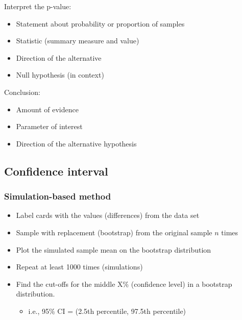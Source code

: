 \documentclass[
]{report}
\providecommand{\tightlist}{%
  \setlength{\itemsep}{0pt}\setlength{\parskip}{0pt}}
\begin{document}
Interpret the p-value:

\begin{itemize}
\item
  Statement about probability or proportion of samples
\item
  Statistic (summary measure and value)
\item
  Direction of the alternative
\item
  Null hypothesis (in context)
\end{itemize}

\vspace{0.8in}

\newpage

Conclusion:

\begin{itemize}
\item
  Amount of evidence
\item
  Parameter of interest
\item
  Direction of the alternative hypothesis
\end{itemize}

\vspace{0.8in}

\subsection*{Confidence interval}\label{confidence-interval-3}

\subsubsection*{Simulation-based method}\label{simulation-based-method-7}

\begin{itemize}
\item
  Label cards with the values (differences) from the data set
\item
  Sample with replacement (bootstrap) from the original sample \(n\) times
\item
  Plot the simulated sample mean on the bootstrap distribution
\item
  Repeat at least 1000 times (simulations)
\item
  Find the cut-offs for the middle X\% (confidence level) in a bootstrap distribution.

  \begin{itemize}
  \tightlist
  \item
    i.e., 95\% CI = (2.5th percentile, 97.5th percentile)
  \end{itemize}
\end{itemize}
\end{document}

